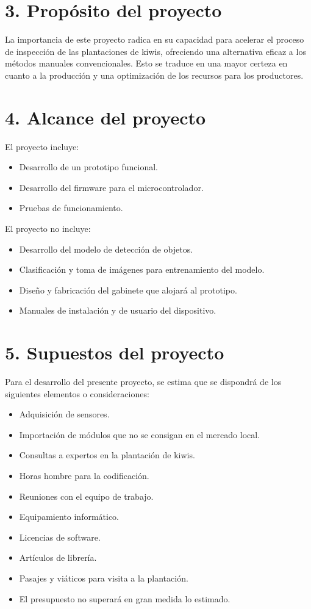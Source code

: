 \documentclass[
11pt, %
]{charter}
\begin{document}
\section{3. Propósito del proyecto}
\label{sec:proposito}

La importancia de este proyecto radica en su capacidad para acelerar el proceso de inspección de las plantaciones de kiwis, ofreciendo una alternativa eficaz a los métodos manuales convencionales. Esto se traduce en una mayor certeza en cuanto a la producción y una optimización de los recursos para los productores.

\section{4. Alcance del proyecto}
\label{sec:alcance}

El proyecto incluye:
\begin{itemize}
    \item Desarrollo de un prototipo funcional.
    \item Desarrollo del firmware para el microcontrolador.
    \item Pruebas de funcionamiento.
\end{itemize}

\newpage

El proyecto no incluye:
\begin{itemize}
	\item Desarrollo del modelo de detección de objetos.
	\item Clasificación y toma de imágenes para entrenamiento del modelo.
    \item Diseño y fabricación del gabinete que alojará al prototipo.
    \item Manuales de instalación y de usuario del dispositivo.
\end{itemize}


\section{5. Supuestos del proyecto}
\label{sec:supuestos}

Para el desarrollo del presente proyecto, se estima que se dispondrá de los siguientes elementos o consideraciones:

\begin{itemize}
	\item Adquisición de sensores.
	\item Importación de módulos que no se consigan en el mercado local.
	\item Consultas a expertos en la plantación de kiwis.
    \item Horas hombre para la codificación.
    \item Reuniones con el equipo de trabajo.
    \item Equipamiento informático.
    \item Licencias de software.
    \item Artículos de librería.
    \item Pasajes y viáticos para visita a la plantación.
    \item El presupuesto no superará en gran medida lo estimado.
\end{itemize}
\end{document}
